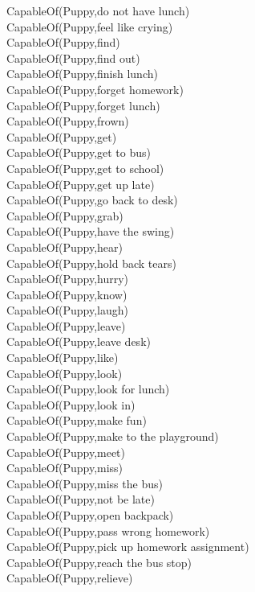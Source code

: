 \begin{multicols}{2}
\begin{footnotesize}
CapableOf(Puppy,do not have lunch) \\
CapableOf(Puppy,feel like crying) \\
CapableOf(Puppy,find) \\
CapableOf(Puppy,find out) \\
CapableOf(Puppy,finish lunch) \\
CapableOf(Puppy,forget homework) \\
CapableOf(Puppy,forget lunch) \\
CapableOf(Puppy,frown) \\
CapableOf(Puppy,get) \\
CapableOf(Puppy,get to bus) \\
CapableOf(Puppy,get to school) \\
CapableOf(Puppy,get up late) \\
CapableOf(Puppy,go back to desk) \\
CapableOf(Puppy,grab) \\
CapableOf(Puppy,have the swing) \\
CapableOf(Puppy,hear) \\
CapableOf(Puppy,hold back tears) \\
CapableOf(Puppy,hurry) \\
CapableOf(Puppy,know) \\
CapableOf(Puppy,laugh) \\
CapableOf(Puppy,leave) \\
CapableOf(Puppy,leave desk) \\
CapableOf(Puppy,like) \\
CapableOf(Puppy,look) \\
CapableOf(Puppy,look for lunch) \\
CapableOf(Puppy,look in) \\
CapableOf(Puppy,make fun) \\
CapableOf(Puppy,make to the playground) \\
CapableOf(Puppy,meet) \\
CapableOf(Puppy,miss) \\
CapableOf(Puppy,miss the bus) \\
CapableOf(Puppy,not be late) \\
CapableOf(Puppy,open backpack) \\
CapableOf(Puppy,pass wrong homework) \\
CapableOf(Puppy,pick up homework assignment) \\
CapableOf(Puppy,reach the bus stop) \\
CapableOf(Puppy,relieve) \\

\end{footnotesize}
\end{multicols}
